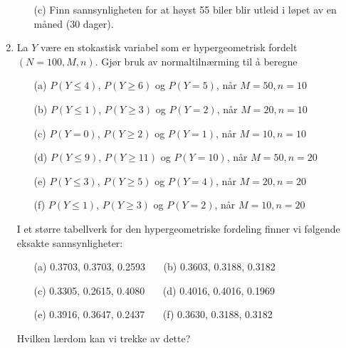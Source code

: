 \begin{enumerate}
\begin{itemize}
     \item[(c)]  Finn sannsynligheten for at høyst 55 biler blir utleid
          i løpet av en måned (30 dager).
     \end{itemize}

\item La $Y$ være en stokastisk variabel som er hypergeometrisk
     fordelt $(N=100, M, n)$. Gjør bruk av normaltilnærming til
     å beregne
    \begin{itemize}
     \item[(a)]  $P(Y\leq 4)$, $P(Y\geq 6)$ og $P(Y=5)$, når $M=50,n=10$
     \item[(b)]  $P(Y\leq 1)$, $P(Y\geq 3)$ og $P(Y=2)$, når $M=20,n=10$
     \item[(c)]  $P(Y=0)$, $P(Y\geq 2)$ og $P(Y=1)$, når $M=10,n=10$
     \item[(d)]  $P(Y\leq 9)$, $P(Y \geq 11)$ og $P(Y=10)$, når
          $M=50,n=20$
     \item[(e)]  $P(Y\leq 3)$, $P(Y\geq 5)$ og $P(Y=4)$, når $M=20,n=20$
     \item[(f)]  $P(Y\leq 1)$, $P(Y\geq 3)$ og $P(Y=2)$, når $M=10,n=20$
    \end{itemize}
     I et større tabellverk for den hypergeometriske fordeling
     finner vi følgende eksakte sannsynligheter:
    \begin{itemize}
     \item[(a)]  0.3703, 0.3703, 0.2593 \ \ \   (b) 0.3603, 0.3188, 0.3182
     \item[(c)]  0.3305, 0.2615, 0.4080 \ \ \   (d) 0.4016, 0.4016, 0.1969
     \item[(e)]  0.3916, 0.3647, 0.2437 \ \ \   (f) 0.3630, 0.3188, 0.3182
    \end{itemize}
     Hvilken lærdom kan vi trekke av dette?


\end{enumerate}
